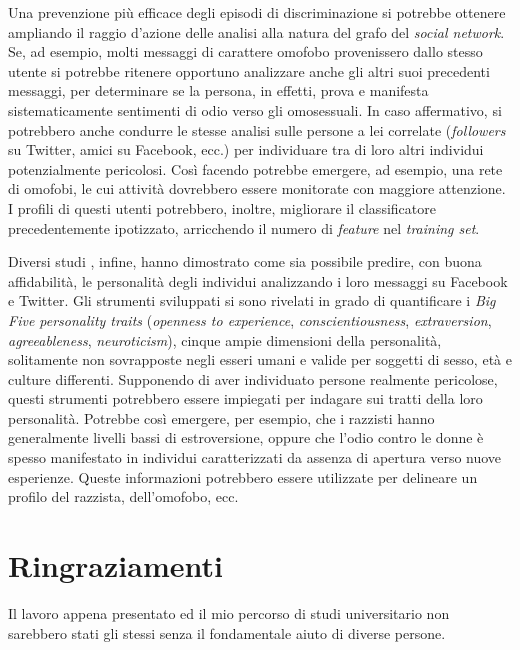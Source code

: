 Una prevenzione più efficace degli episodi di discriminazione si potrebbe ottenere ampliando il raggio d'azione delle analisi alla natura del grafo del \textit{social network}.
Se, ad esempio, molti messaggi di carattere omofobo provenissero dallo stesso utente si potrebbe ritenere opportuno analizzare 
anche gli altri suoi precedenti messaggi, per determinare se la persona, in effetti, prova e manifesta sistematicamente sentimenti di odio verso gli omosessuali.
In caso affermativo, si potrebbero anche condurre le stesse analisi sulle persone a lei correlate (\textit{followers} su Twitter, amici su Facebook, ecc.) per individuare tra di loro altri 
individui potenzialmente pericolosi. 
Così facendo potrebbe emergere, ad esempio, una rete di omofobi, le cui attività dovrebbero essere monitorate con maggiore attenzione. 
I profili di questi utenti potrebbero, inoltre, migliorare il classificatore precedentemente ipotizzato, arricchendo il numero di \textit{feature} nel \textit{training set}.

Diversi studi \cite{predpers1} \cite{predpers2} \cite{predpers3} \cite{predpers4}, infine, hanno dimostrato come sia possibile predire, con buona affidabilità, 
le personalità degli individui analizzando i loro messaggi su Facebook e Twitter.
Gli strumenti sviluppati si sono rivelati in grado di quantificare i \textit{Big Five personality traits} (\textit{openness to experience}, \textit{conscientiousness}, 
\textit{extraversion}, \textit{agreeableness}, \textit{neuroticism}), cinque ampie dimensioni della personalità, solitamente non sovrapposte negli esseri umani e valide 
per soggetti di sesso, età e culture differenti.
Supponendo di aver individuato persone realmente pericolose, questi strumenti potrebbero essere impiegati per indagare sui tratti della loro personalità. 
Potrebbe così emergere, per esempio, che i razzisti hanno generalmente livelli bassi di estroversione, oppure che l'odio contro le donne è spesso manifestato in individui 
caratterizzati da assenza di apertura verso nuove esperienze.
Queste informazioni potrebbero essere utilizzate per delineare un profilo del razzista, dell'omofobo, ecc.

\chapter*{Ringraziamenti}

Il lavoro appena presentato ed il mio percorso di studi universitario non sarebbero stati gli stessi senza il fondamentale aiuto di diverse persone. 

